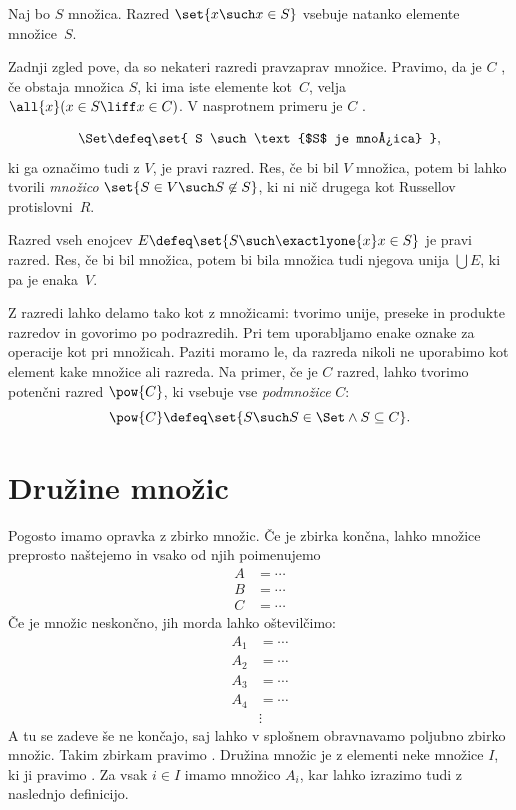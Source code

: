 \begin{zgled}
  Naj bo $S$ množica. Razred $\set{x \such x \in S}$ vsebuje natanko elemente množice~$S$.
\end{zgled}

Zadnji zgled pove, da so nekateri razredi pravzaprav množice. Pravimo, da je $C$ , če obstaja množica $S$, ki ima iste elemente kot~$C$, velja $\all{x} (x \in S \liff x \in C)$. V nasprotnem primeru je $C$ .

\begin{zgled}
  \begin{equation*}
    \Set \defeq \set{ S \such \text{$S$ je množica} },
  \end{equation*}
  ki ga označimo tudi z $V$, je pravi razred. Res, če bi bil $V$ množica,
  potem bi lahko tvorili \emph{množico}
  $\set{ S \in V \such S \not\in S}$,
  ki ni nič drugega kot Russellov protislovni~$R$.
\end{zgled}

\begin{zgled}
  Razred vseh enojcev $E \defeq \set{ S \such \exactlyone{x} x \in S }$ je pravi razred. Res, če bi bil množica, potem bi bila množica tudi njegova unija $\bigcup E$, ki pa je enaka~$V$.
\end{zgled}

Z razredi lahko delamo tako kot z množicami: tvorimo unije, preseke in produkte
razredov in govorimo po podrazredih. Pri tem uporabljamo enake oznake za
operacije kot pri množicah. Paziti moramo le, da razreda nikoli ne uporabimo kot
element kake množice ali razreda. Na primer, če je $C$ razred, lahko tvorimo
potenčni razred $\pow{C}$, ki vsebuje vse \emph{podmnožice} $C$:
\begin{equation*}
  \pow{C} \defeq \set{ S \such S \in \Set \land S \subseteq C }.
\end{equation*}

\section{Družine množic}

Pogosto imamo opravka z zbirko množic. Če je zbirka končna, lahko množice preprosto
naštejemo in vsako od njih poimenujemo
%
\begin{align*}
    A &= \cdots \\
    B &= \cdots \\
    C &= \cdots
\end{align*}
%
Če je množic neskončno, jih morda lahko oštevilčimo:
%
\begin{align*}
    A_1 &= \cdots \\
    A_2 &= \cdots \\
    A_3 &= \cdots \\
    A_4 &= \cdots \\
        &\vdots
\end{align*}
%
A tu se zadeve še ne končajo, saj lahko v splošnem obravnavamo poljubno zbirko množic.
Takim zbirkam pravimo . Družina množic je  z elementi neke množice $I$, ki ji pravimo . Za vsak $i \in I$ imamo množico $A_i$,  kar lahko izrazimo tudi z naslednjo definicijo.

